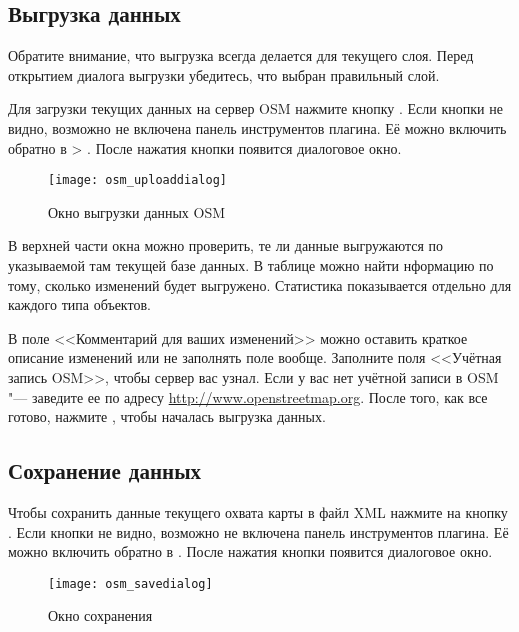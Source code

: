 \subsection{Выгрузка данных}

Обратите внимание, что выгрузка всегда делается для текущего слоя. Перед
открытием диалога выгрузки убедитесь, что выбран правильный слой.

Для загрузки текущих данных на сервер OSM нажмите кнопку
. Если кнопки не видно,
возможно не включена панель инструментов плагина. Её можно включить
обратно в  \arrow {} >
. После нажатия кнопки 
появится диалоговое окно.

\begin{figure}[ht]
   \centering
   \texttt{[image: osm\_uploaddialog]}
   \caption{Окно выгрузки данных OSM \nixcaption}\label{fig:osmupload}
\end{figure}

В верхней части окна можно проверить, те ли данные выгружаются по
указываемой там текущей базе данных. В таблице можно найти нформацию по
тому, сколько изменений будет выгружено. Статистика показывается
отдельно для каждого типа объектов.

В поле <<Комментарий для ваших изменений>> можно оставить краткое
описание изменений или не заполнять поле вообще. Заполните поля
<<Учётная запись OSM>>, чтобы сервер вас узнал. Если у вас нет учётной
записи в OSM "--- заведите ее по адресу \url{http://www.openstreetmap.org}.
После того, как все готово, нажмите , чтобы началась
выгрузка данных.

\subsection{Сохранение данных}

Чтобы сохранить данные текущего охвата карты в файл XML нажмите на кнопку
. Если кнопки не видно, возможно
не включена панель инструментов плагина. Её можно включить обратно в
 \arrow {} \arrow
{}. После нажатия кнопки появится диалоговое
окно.

\begin{figure}[ht]
   \centering
   \texttt{[image: osm\_savedialog]}
   \caption{Окно сохранения \nixcaption}\label{fig:osmsave}
\end{figure}

